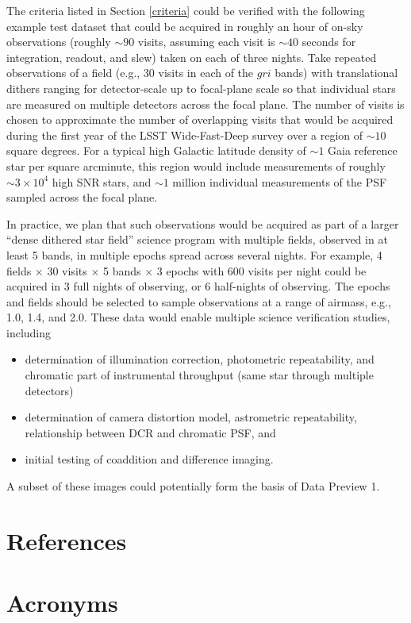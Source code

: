 \documentclass[SE,authoryear,toc,lsstdraft]{lsstdoc}
\begin{document}
The criteria listed in Section \ref{criteria} could be verified with the following example test dataset that could be acquired in roughly an hour of on-sky observations (roughly $\sim90$ visits, assuming each visit is $\sim40$ seconds for integration, readout, and slew) taken on each of three nights.
Take repeated observations of a field (e.g., 30 visits in each of the $gri$ bands) with translational dithers ranging for detector-scale up to focal-plane scale so that individual stars are measured on multiple detectors across the focal plane.
The number of visits is chosen to approximate the number of overlapping visits that would be acquired during the first year of the LSST Wide-Fast-Deep survey over a region of $\sim10$ square degrees.
For a typical high Galactic latitude density of $\sim1$ Gaia reference star per square arcminute, this region would include measurements of roughly $\sim3 \times 10^4$ high SNR stars, and $\sim1$ million individual measurements of the PSF sampled across the focal plane.

In practice, we plan that such observations would be acquired as part of a larger ``dense dithered star field'' science program with multiple fields, observed in at least 5 bands, in multiple epochs spread across several nights.
For example, 4 fields $\times$ 30 visits $\times$ 5 bands $\times$ 3 epochs with 600 visits per night could be acquired in 3 full nights of observing, or 6 half-nights of observing.
The epochs and fields should be selected to sample observations at a range of airmass, e.g., 1.0, 1.4, and 2.0.
These data would enable multiple science verification studies, including
\begin{itemize}
  \item determination of illumination correction, photometric repeatability, and chromatic part of instrumental throughput (same star through multiple detectors)
  \item determination of camera distortion model, astrometric repeatability, relationship between DCR and chromatic PSF, and
  \item initial testing of coaddition and difference imaging.
\end{itemize}

A subset of these images could potentially form the basis of Data Preview 1.

\appendix
\section{References} \label{sec:bib}
\renewcommand{\refname}{} %


\section{Acronyms} \label{sec:acronyms}

\end{document}
